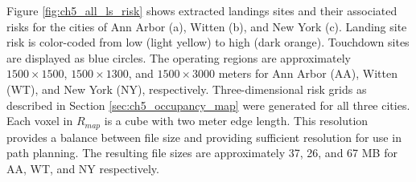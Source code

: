 Figure \ref{fig:ch5_all_ls_risk} shows extracted landings sites and their associated risks for the cities of Ann Arbor (a), Witten (b), and New York (c). Landing site risk is color-coded from low (light yellow) to high (dark orange). Touchdown sites are displayed as blue circles.
The operating regions are approximately $1500\times1500$, $1500\times1300$, and $1500\times3000$ meters for Ann Arbor (AA), Witten (WT), and New York (NY), respectively. Three-dimensional risk grids as described in Section \ref{sec:ch5_occupancy_map} were generated for all three cities. Each voxel in $R_{map}$ is a cube with two meter edge length. This resolution provides a balance between file size and providing sufficient resolution for use in path planning. The resulting file sizes are approximately 37, 26, and 67 MB for AA, WT, and NY respectively.


